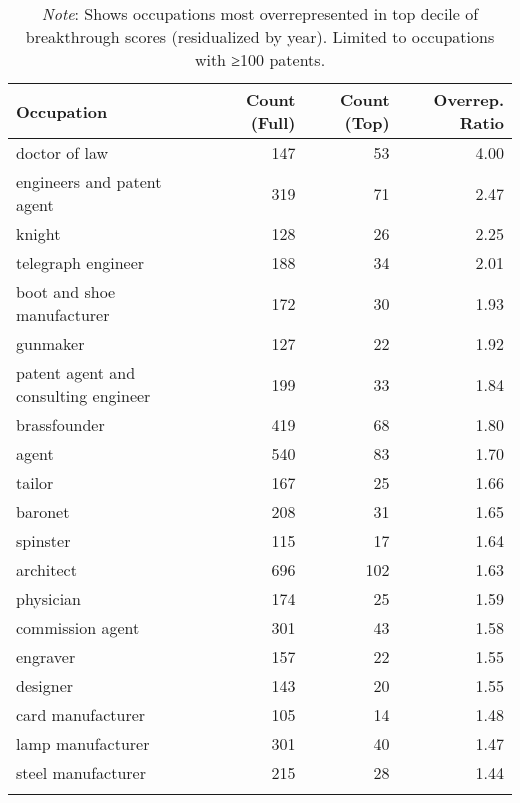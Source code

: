 \begin{table}[H]
\centering
\caption{Top 20 Overrepresented Occupations in Breakthrough Patents}
\label{tab:overrep_occ}
\begin{tabular}{lrrr}
\toprule
Occupation & Count (Full) & Count (Top) & Overrep. Ratio \\
\midrule
doctor of law & 147 & 53 & 4.00 \\
engineers and patent agent & 319 & 71 & 2.47 \\
knight & 128 & 26 & 2.25 \\
telegraph engineer & 188 & 34 & 2.01 \\
boot and shoe manufacturer & 172 & 30 & 1.93 \\
gunmaker & 127 & 22 & 1.92 \\
patent agent and consulting engineer & 199 & 33 & 1.84 \\
brassfounder & 419 & 68 & 1.80 \\
agent & 540 & 83 & 1.70 \\
tailor & 167 & 25 & 1.66 \\
baronet & 208 & 31 & 1.65 \\
spinster & 115 & 17 & 1.64 \\
architect & 696 & 102 & 1.63 \\
physician & 174 & 25 & 1.59 \\
commission agent & 301 & 43 & 1.58 \\
engraver & 157 & 22 & 1.55 \\
designer & 143 & 20 & 1.55 \\
card manufacturer & 105 & 14 & 1.48 \\
lamp manufacturer & 301 & 40 & 1.47 \\
steel manufacturer & 215 & 28 & 1.44 \\
\bottomrule
\caption*{\textit{Note}: Shows occupations most overrepresented in top decile of 
breakthrough scores (residualized by year). Limited to occupations with ≥100 patents.}
\end{tabular}
\end{table}